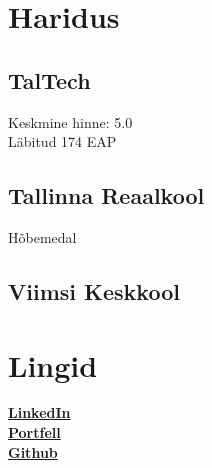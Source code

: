 \documentclass[letterpaper]{deedy-resume} %
\begin{document}
\begin{minipage}[t]{0.33\textwidth} %


\section{Haridus}

\subsection{TalTech}

Keskmine hinne: 5.0 \\
Läbitud 174 EAP


\sectionspace %

\subsection{Tallinna Reaalkool}

Hõbemedal

\sectionspace %

\subsection{Viimsi Keskkool}

\sectionspace %


\section{Lingid}

\href{https://www.linkedin.com/in/evo-annus-094362231/}{\bf LinkedIn} \\
\href{https://susiik.github.io/}{\bf Portfell} \\
\href{https://github.com/susIik}{\bf Github} \\

\sectionspace %


\end{minipage}
\end{document}
